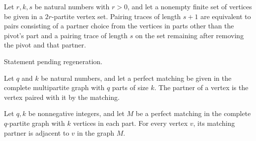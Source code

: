 \begin{definition}
\label{FABL.partitePairingTraceSuccEquiv}
\leanok
{}
Let $r,k,s$ be natural numbers with $r>0$, and let a nonempty finite set of vertices be
given in a $2r$-partite vertex set. Pairing traces of length $s+1$ are equivalent to
pairs consisting of a partner choice from the vertices in parts other than the pivot's
part and a pairing trace of length $s$ on the set remaining after removing the pivot and
that partner.
\end{definition}

\begin{theorem}
\label{FABL.card_partitePairingTrace_le}
\leanok
{}
Statement pending regeneration.
\end{theorem}

\begin{definition}
\label{FABL.graphPartiteMatchingPartner}
\leanok
{}
Let $q$ and $k$ be natural numbers, and let a perfect matching be given in the complete
multipartite graph with $q$ parts of size $k$. The partner of a vertex is the vertex
paired with it by the matching.
\end{definition}

\begin{theorem}
\label{FABL.graphPartiteMatchingPartner_adj}
\leanok
{}
Let $q,k$ be nonnegative integers, and let $M$ be a perfect matching in the complete
$q$-partite graph with $k$ vertices in each part. For every vertex $v$, its matching
partner is adjacent to $v$ in the graph $M$.
\end{theorem}

